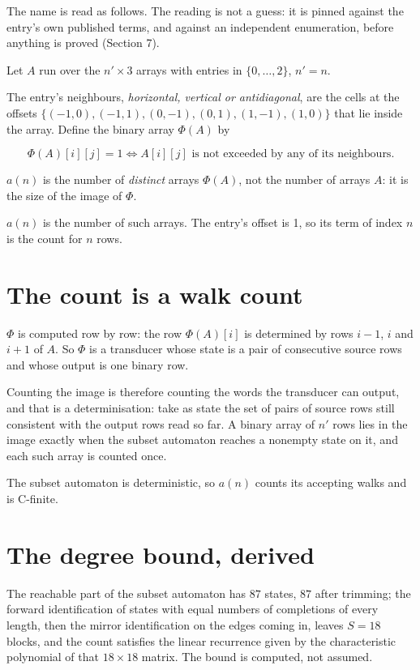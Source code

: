 \documentclass[11pt]{article}
\theoremstyle{definition}
\begin{document}
The name is read as follows. The reading is not a guess: it is pinned against the entry's own published terms, and against an independent enumeration, before anything is proved (Section 7).

Let $A$ run over the $n' \times 3$ arrays with entries in $\{0,\dots,2\}$, $n' = n$.

The entry's neighbours, {\itshape horizontal, vertical or antidiagonal}, are the cells at the offsets $\{(-1,0), (-1,1), (0,-1), (0,1), (1,-1), (1,0)\}$ that lie inside the array. Define the binary array $\Phi(A)$ by

\[\Phi(A)[i][j] = 1 \iff A[i][j] \text{ is not exceeded by any of its neighbours}.\]

$a(n)$ is the number of {\itshape distinct} arrays $\Phi(A)$, not the number of arrays $A$: it is the size of the image of $\Phi$.

$a(n)$ is the number of such arrays. The entry's offset is 1, so its term of index $n$ is the count for $n$ rows.

\section{The count is a walk count}

$\Phi$ is computed row by row: the row $\Phi(A)[i]$ is determined by rows $i-1$, $i$ and $i+1$ of $A$. So $\Phi$ is a transducer whose state is a pair of consecutive source rows and whose output is one binary row.

Counting the image is therefore counting the words the transducer can output, and that is a determinisation: take as state the set of pairs of source rows still consistent with the output rows read so far. A binary array of $n'$ rows lies in the image exactly when the subset automaton reaches a nonempty state on it, and each such array is counted once.

The subset automaton is deterministic, so $a(n)$ counts its accepting walks and is C-finite.

\section{The degree bound, derived}

The reachable part of the subset automaton has $87$ states, $87$ after trimming; the forward identification of states with equal numbers of completions of every length, then the mirror identification on the edges coming in, leaves $S = 18$ blocks, and the count satisfies the linear recurrence given by the characteristic polynomial of that $18\times18$ matrix. The bound is computed, not assumed.
\end{document}
